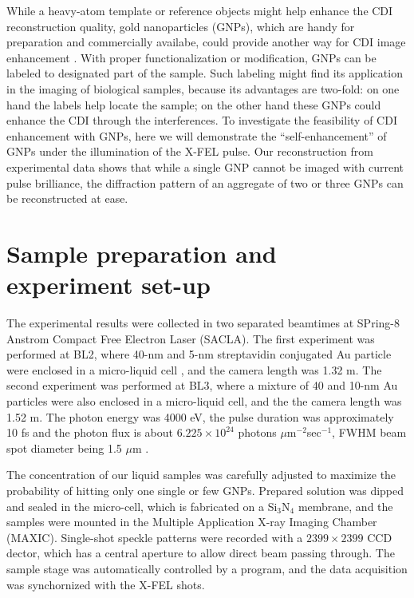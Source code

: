 \documentclass[10pt,letterpaper]{article}
\begin{document}
While a heavy-atom template or reference objects might help enhance the CDI reconstruction quality, gold nanoparticles (GNPs), which are handy for preparation and commercially availabe, could provide another way for CDI image enhancement \cite{shintake}.
With proper functionalization or modification, GNPs can be labeled to designated part of the sample.
Such labeling might find its application in the imaging of biological samples, because its advantages are two-fold: on one hand the labels help locate the sample; on the other hand these GNPs could enhance the CDI through the interferences.
To investigate the feasibility of CDI enhancement with GNPs, here we will demonstrate the ``self-enhancement'' of GNPs under the illumination of the X-FEL pulse. Our reconstruction from experimental data shows that while a single GNP cannot be imaged with current pulse brilliance, the diffraction pattern of an aggregate of two or three GNPs can be reconstructed at ease.




\section{Sample preparation and experiment set-up}

The experimental results were collected in two separated beamtimes at SPring-8 Anstrom Compact Free Electron Laser (SACLA). 
The first experiment was performed at BL2, where 40-nm and 5-nm streptavidin conjugated Au particle were enclosed in a micro-liquid cell \cite{micro-liquid}, and the camera length was 1.32 m. 
The second experiment was performed at BL3, where a mixture of 40 and 10-nm Au particles were also enclosed in a micro-liquid cell, and the the camera length was 1.52 m. 
The photon energy was 4000 eV, the pulse duration was approximately 10 fs and the photon flux is about $6.225\times 10^{24}$ photons $\mu$m$^{-2}$sec$^{-1}$, FWHM beam spot diameter being 1.5 $\mu$m \cite{xfel-ssr}.

The concentration of our liquid samples was carefully adjusted to maximize the probability of hitting only one single or few GNPs. 
Prepared solution was dipped and sealed in the micro-cell, which is fabricated on a Si$_3$N$_4$ membrane, and the samples were mounted in the Multiple Application X-ray Imaging Chamber (MAXIC). 
Single-shot speckle patterns were recorded with a $2399\times2399$ CCD dector, which has a central aperture to allow direct beam passing through. 
The sample stage was automatically controlled by a program, and the data acquisition was synchornized with the X-FEL shots.
\end{document}
